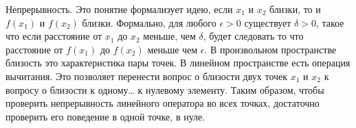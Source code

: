\documentclass[12pt, a4paper]{article}
\begin{document}
Непрерывность. Это понятие формализует идею, если $x_1$ и $x_2$ близки, то и $f(x_1)$ и $f(x_2)$ близки. Формально, для любого $\epsilon > 0$ существует $\delta > 0$, такое что если расстояние от $x_1$ до $x_2$ меньше, чем $\delta$, будет следовать то что расстояние от $f(x_1)$ до $f(x_2)$ меньше чем $\epsilon$. В произвольном пространстве близость это характеристика пары точек. В линейном пространстве есть операция вычитания. Это позволяет перенести вопрос о близости двух точек $x_1$ и $x_2$ к вопросу о близости к одному… к нулевому элементу. Таким образом, чтобы проверить непрерывность линейного оператора во всех точках, достаточно проверить его поведение в одной точке, в нуле.
\end{document}
